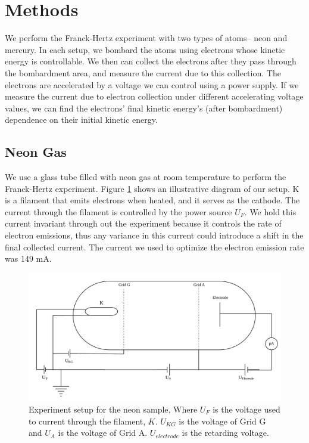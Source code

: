 \documentclass[prb,preprint]{revtex4-1}
\begin{document}
\section{Methods}

We perform the Franck-Hertz experiment with two types of atoms-- neon and mercury. In each setup, we bombard the atoms using electrons whose kinetic energy is controllable. We then can collect the electrons after they pass through the bombardment area, and measure the current due to this collection. The electrons are accelerated by a voltage we can control using a power supply. If we measure the current due to electron collection under different accelerating voltage values, we can find the electrons' final kinetic energy's (after bombardment) dependence on their initial kinetic energy.

\subsection{Neon Gas}

We use a glass tube filled with neon gas at room temperature to perform the Franck-Hertz experiment. Figure \ref{figneon} shows an illustrative diagram of our setup. K is a filament that emits electrons when heated, and it serves as the cathode. The current through the filament is controlled by the power source $U_{F}$. We hold this current invariant through out the experiment because it controls the rate of electron emissions, thus any variance in this current could introduce a shift in the final collected current. The current we used to optimize the electron emission rate was 149 mA.

\begin{figure}
    \centering
    \includegraphics[width=\textwidth]{figneon.png}
    \caption{Experiment setup for the neon sample. Where $U_F$ is the voltage used to current through the filament, $K$. $U_{KG}$ is the voltage of Grid G and $U_A$ is the voltage of Grid A. $U_{electrode}$ is the retarding voltage.}
    \label{figneon}
    \end{figure}
\end{document}
